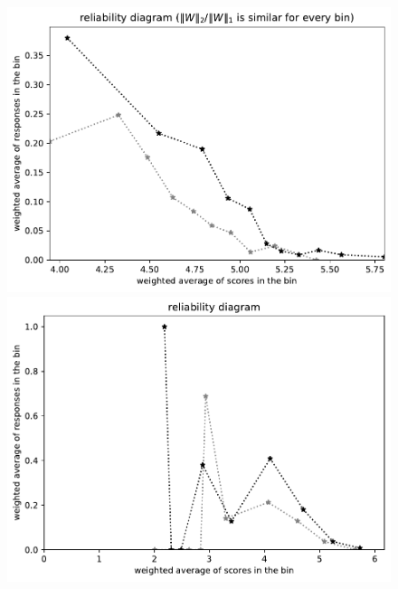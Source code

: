 \documentclass{article}
\newlength{\vertsep}
\newlength{\imsize}
\begin{document}
\begin{figure}
\begin{centering}
\parbox{\imsize}{\includegraphics[width=\imsize]
{../codes/weighted/County_of_San_Francisco_vs_Kern-LNGI/equierrs10.pdf}}
\quad\quad
\parbox{\imsize}{\includegraphics[width=\imsize]
{../codes/weighted/County_of_San_Francisco_vs_Kern-LNGI/equiscores10.pdf}}

\vspace{\vertsep}


\end{centering}
\end{figure}
\end{document}
